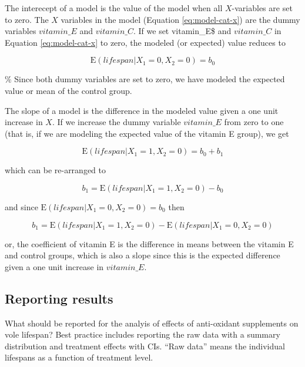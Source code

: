 \documentclass[]{book}
\theoremstyle{definition}
\theoremstyle{definition}
\theoremstyle{definition}
\theoremstyle{remark}
\begin{document}
The interecept of a model is the value of the model when all
\(X\)-variables are set to zero. The \(X\) variables in the model
(Equation \eqref{eq:model-cat-x}) are the dummy variables \(vitamin\_E\)
and \(vitamin\_C\). If we set vitamin\_E\$ and \(vitamin\_C\) in
Equation \eqref{eq:model-cat-x} to zero, the modeled (or expected) value
reduces to

\begin{equation}
\mathrm{E}(lifespan|X_1=0, X_2=0) = b_0
\end{equation}

\% Since both dummy variables are set to zero, we have modeled the
expected value or mean of the control group.

The slope of a model is the difference in the modeled value given a one
unit increase in \(X\). If we increase the dummy variable \(vitamin\_E\)
from zero to one (that is, if we are modeling the expected value of the
vitamin E group), we get

\begin{equation}
\mathrm{E}(lifespan|X_1=1, X_2=0) = b_0 + b_1
\end{equation}

which can be re-arranged to

\begin{equation}
b_1 = \mathrm{E}(lifespan|X_1=1, X_2=0) - b_0
\end{equation}

and since \(\mathrm{E}(lifespan|X_1=0, X_2=0) = b_0\) then

\begin{equation}
b_1 = \mathrm{E}(lifespan|X_1=1, X_2=0) - \mathrm{E}(lifespan|X_1=0, X_2=0)
\end{equation}

or, the coefficient of vitamin E is the difference in means between the
vitamin E and control groups, which is also a slope since this is the
expected difference given a one unit increase in \(vitamin\_E\).

\subsection{Reporting results}\label{reporting-results-1}

What should be reported for the analyis of effects of anti-oxidant
supplements on vole lifespan? Best practice includes reporting the raw
data with a summary distribution and treatment effects with CIs. ``Raw
data'' means the individual lifespans as a function of treatment level.
\end{document}
